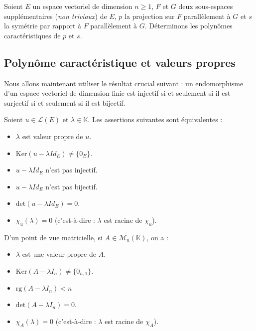 \documentclass[a4paper,10pt]{report}
\begin{document}
\begin{ex} Soient $E$ un espace vectoriel de dimension $n \geq 1$, $F$ et $G$ deux sous-espaces supplémentaires (\textit{non triviaux}) de $E$, $p$ la projection sur $F$ parallèlement à $G$ et $s$ la symétrie par rapport à $F$ parallèlement à $G$. Déterminons les polynômes caractéristiques de $p$ et $s$.

\vspace{11cm}
\end{ex}

\subsection{Polynôme caractéristique et valeurs propres}

\noindent Nous allons maintenant utiliser le résultat crucial suivant : un endomorphisme d'un espace vectoriel de dimension finie est injectif si et seulement si il est surjectif si et seulement si il est bijectif.

\medskip

\noindent Soient $u \in \mathcal{L}(E)$ et $\lambda \in \mathbb{K}$. Les assertions suivantes sont équivalentes :

\begin{itemize}
\item $\lambda$ est valeur propre de $u$.
\item $\textrm{Ker}(u- \lambda Id_E) \neq \lbrace 0_E \rbrace$.
\item $u- \lambda Id_E$ n'est pas injectif.
\item $u- \lambda Id_E$ n'est pas bijectif.
\item $\textrm{det}(u- \lambda Id_E) = 0$.
\item $\chi_u(\lambda) = 0$ (c'est-à-dire : $\lambda$ est racine de $\chi_u$).
\end{itemize}

D'un point de vue matricielle, si $A \in \mathcal{M}_{n}(\mathbb{K})$, on a :

\begin{itemize}
\item $\lambda$ est une valeur propre de $A$.
\item $\textrm{Ker}(A- \lambda I_n) \neq \lbrace 0_{n,1} \rbrace$.
\item $\textrm{rg}(A- \lambda I_n) <n$
\item $\textrm{det}(A- \lambda I_n) = 0$.
\item $\chi_A(\lambda) = 0$ (c'est-à-dire : $\lambda$ est racine de $\chi_A$).
\end{itemize}
\end{document}
